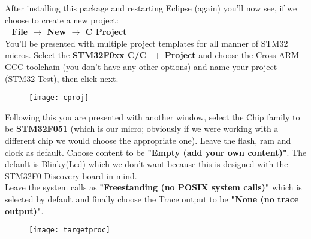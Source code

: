 {{\newpage
After installing this package and restarting Eclipse (again) you'll now see, if we choose to create a new project:\\
\-\ \hspace{20pt}\textbf{\color{Green} File $\rightarrow$ New $\rightarrow$ C Project}
\\
You’ll be presented with multiple project templates for all manner of STM32 micros. Select the \textbf{\color{Purple} STM32F0xx C/C++ Project} and choose the Cross ARM GCC toolchain (you don’t have any other options) and name your project (STM32 Test), then click next. 
\begin{figure}[htbp]
\centering
\texttt{[image: cproj]}
\end{figure}
\par
{}
\newpage
Following this you are presented with another window, select the Chip family to be \textbf{\color{Purple} STM32F051} (which is our micro; obviously if we were working with a different chip we would choose the appropriate one). Leave the flash, ram and clock as default. Choose content to be \textbf{\color{Purple} "Empty (add your own content)"}. The default is Blinky(Led) which we don't want because this is designed with the STM32F0 Discovery board in mind.
\\
Leave the system calls as \textbf{\color{Purple} "Freestanding (no POSIX system calls)"} which is selected by default and finally choose the Trace output to be \textbf{\color{Purple} "None (no trace output)"}.
\begin{figure}[htbp]
\centering
\texttt{[image: targetproc]}
\end{figure}
}}
